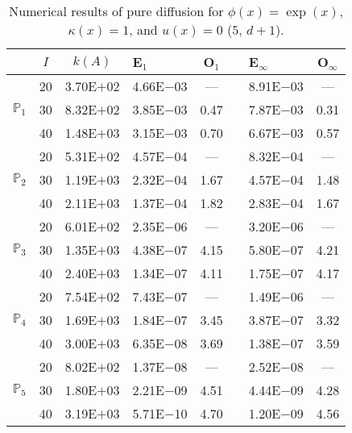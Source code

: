 \begin{table}[H]
\centering
\caption{Numerical results of pure diffusion for $\phi(x)=\exp(x)$, $\kappa(x)=1$, and $u(x)=0$ ($5,\,d+1$).}
\begin{tabular}{@{}l c c l c c l c@{}}
\toprule
 & $I$ & $k(A)$ & E$_1$ & O$_1$ && E$_{\infty}$ & O$_{\infty}$\\
\midrule
\multirow{3}{*}{$\mathbb{P}_{1}$}
 & 20 & 3.70E$+$02 & 4.66E$-$03 & --- && 8.91E$-$03 & ---\\
 & 30 & 8.32E$+$02 & 3.85E$-$03 & 0.47 && 7.87E$-$03 & 0.31\\
 & 40 & 1.48E$+$03 & 3.15E$-$03 & 0.70 && 6.67E$-$03 & 0.57\\
\midrule
\multirow{3}{*}{$\mathbb{P}_{2}$}
 & 20 & 5.31E$+$02 & 4.57E$-$04 & --- && 8.32E$-$04 & ---\\
 & 30 & 1.19E$+$03 & 2.32E$-$04 & 1.67 && 4.57E$-$04 & 1.48\\
 & 40 & 2.11E$+$03 & 1.37E$-$04 & 1.82 && 2.83E$-$04 & 1.67\\
\midrule
\multirow{3}{*}{$\mathbb{P}_{3}$}
 & 20 & 6.01E$+$02 & 2.35E$-$06 & --- && 3.20E$-$06 & ---\\
 & 30 & 1.35E$+$03 & 4.38E$-$07 & 4.15 && 5.80E$-$07 & 4.21\\
 & 40 & 2.40E$+$03 & 1.34E$-$07 & 4.11 && 1.75E$-$07 & 4.17\\
\midrule
\multirow{3}{*}{$\mathbb{P}_{4}$}
 & 20 & 7.54E$+$02 & 7.43E$-$07 & --- && 1.49E$-$06 & ---\\
 & 30 & 1.69E$+$03 & 1.84E$-$07 & 3.45 && 3.87E$-$07 & 3.32\\
 & 40 & 3.00E$+$03 & 6.35E$-$08 & 3.69 && 1.38E$-$07 & 3.59\\
\midrule
\multirow{3}{*}{$\mathbb{P}_{5}$}
 & 20 & 8.02E$+$02 & 1.37E$-$08 & --- && 2.52E$-$08 & ---\\
 & 30 & 1.80E$+$03 & 2.21E$-$09 & 4.51 && 4.44E$-$09 & 4.28\\
 & 40 & 3.19E$+$03 & 5.71E$-$10 & 4.70 && 1.20E$-$09 & 4.56\\
\bottomrule
\end{tabular}
\end{table}